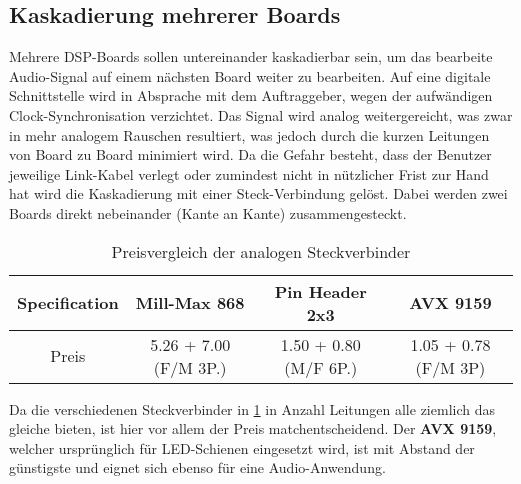 \subsection{Kaskadierung mehrerer Boards}
\label{subsec:Konzept_Kaskadierung}

Mehrere DSP-Boards sollen untereinander kaskadierbar sein, um das bearbeite Audio-Signal auf einem nächsten Board weiter zu bearbeiten. Auf eine digitale Schnittstelle wird in Absprache mit dem Auftraggeber,  wegen der aufwändigen Clock-Synchronisation verzichtet. Das Signal wird analog weitergereicht, was zwar in mehr analogem Rauschen resultiert, was jedoch durch die kurzen Leitungen von Board zu Board minimiert wird. Da die Gefahr besteht, dass der Benutzer jeweilige Link-Kabel verlegt oder zumindest nicht in nützlicher Frist zur Hand hat wird die Kaskadierung mit einer Steck-Verbindung gelöst. Dabei werden zwei Boards direkt nebeinander (Kante an Kante) zusammengesteckt.


\begin{table}[H]
	\centering
	\begin{tabular}{|c|c|c|c|}
		\hline
		\textbf{Specification} & \textbf{Mill-Max 868}             & \textbf{Pin Header 2x3} & \textbf{AVX 9159} \\ \hline
		Preis         & 5.26 + 7.00 (F/M 3P.)& 1.50 + 0.80 (M/F 6P.)&1.05 + 0.78 (F/M 3P)         \\ \hline
	\end{tabular}
	\caption{Preisvergleich der analogen Steckverbinder}
	\label{tab:stecker}
\end{table}

Da die verschiedenen Steckverbinder in \ref{tab:stecker} in Anzahl Leitungen alle ziemlich das gleiche bieten, ist hier vor allem der Preis matchentscheidend. Der \textbf{AVX 9159}, welcher ursprünglich für LED-Schienen eingesetzt wird, ist mit Abstand der günstigste und eignet sich ebenso für eine Audio-Anwendung.



%
